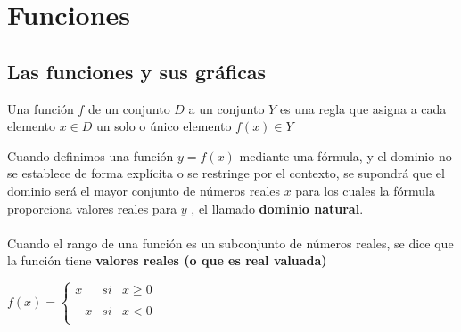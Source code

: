 \chapter{Funciones}

\section{Las funciones y sus gráficas}

    \begin{tcolorbox}[colframe=white]
	\begin{def.}
	    Una función $f$ de un conjunto $D$ a un conjunto $Y$ es una regla que asigna a cada elemento $x \in D$ un solo o único elemento $f(x) \in Y$\\
	\end{def.}
    \end{tcolorbox}

    \begin{tcolorbox}[colframe=white]
	\begin{def.}
	    Cuando definimos una función $y = f(x)$ mediante una fórmula, y el dominio no se establece de forma explícita o se restringe por el contexto, se supondrá que el dominio será el mayor conjunto de números reales $x$ para los cuales la fórmula proporciona valores reales para $y$ , el llamado \textbf{dominio natural}.\\\\
	    Cuando el rango de una función es un subconjunto de números reales, se dice que la función tiene \textbf{valores reales (o que es real valuada)}\\
	\end{def.}
    \end{tcolorbox}

    \begin{tcolorbox}[colframe=white]
	\begin{def.}
	    $f(x)=\left\{\begin{array}{rcl}
		x&si&x\geq 0\\
		\\ -x&si&x<0\\
	    \end{array} \right.$
	\end{def.}
    \end{tcolorbox}

